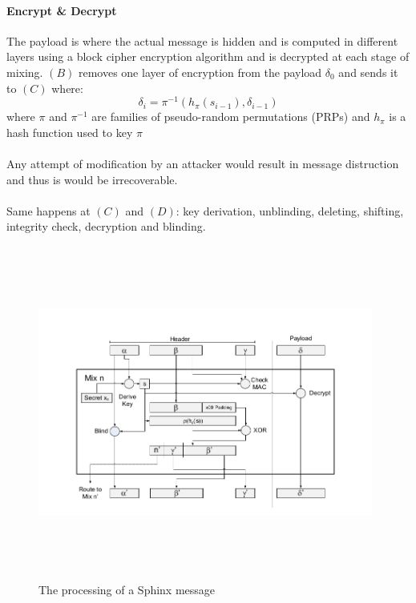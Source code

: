 \paragraph{Encrypt \& Decrypt}
The payload is where the actual message is hidden and is computed in different layers using a block cipher encryption algorithm and is decrypted at each stage of mixing. $(B)$ removes one layer of encryption from the payload $\delta_0$ and sends it to $(C)$ where:
$$\delta_i=\pi^{-1}(h_{\pi}(s_{i-1}), \delta_{i-1})$$
where $\pi$ and $\pi^{-1}$ are families of pseudo-random permutations (PRPs) and $h_{\pi}$ is a hash function used to key $\pi$
\\~\\Any attempt of modification by an attacker would result in message distruction and thus is would be irrecoverable.
\\~\\Same happens at $(C)$ and $(D)$: key derivation, unblinding, deleting, shifting, integrity check, decryption and blinding.
\begin{figure}[H]
    \centering
    \includegraphics[width=11cm,height=11cm,keepaspectratio]{../yellowpaper/images/sphinx1.png}
    \caption{The processing of a Sphinx message}
    \label{fig:The processing of a Sphinx message }
\end{figure}
